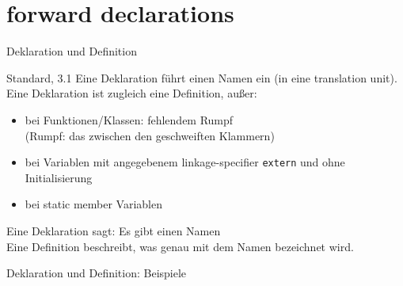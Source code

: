 \section{forward declarations}

\begin{frame}[fragile]{Deklaration und Definition}
	\begin{block}{Standard, 3.1}
		Eine Deklaration führt einen Namen ein (in eine translation unit).\\
		Eine Deklaration ist zugleich eine Definition, außer:
		\begin{itemize}
			\item bei Funktionen/Klassen: fehlendem Rumpf \\
				{\tiny (Rumpf: das zwischen den geschweiften Klammern) }
			\item bei Variablen mit angegebenem linkage-specifier \verb|extern| und ohne Initialisierung
			\item bei static member Variablen
		\end{itemize}
	\end{block}
	
	\vspace{1em}
	
	\uncover<+->
	{
		Eine Deklaration sagt: Es gibt einen Namen \\
		Eine Definition beschreibt, was genau mit dem Namen bezeichnet wird.
	}
\end{frame}


\begin{frame}{Deklaration und Definition: Beispiele}
	\onslide*<+>
	{
		
	}
	\onslide*<+>
	{
		
	}
\end{frame}


